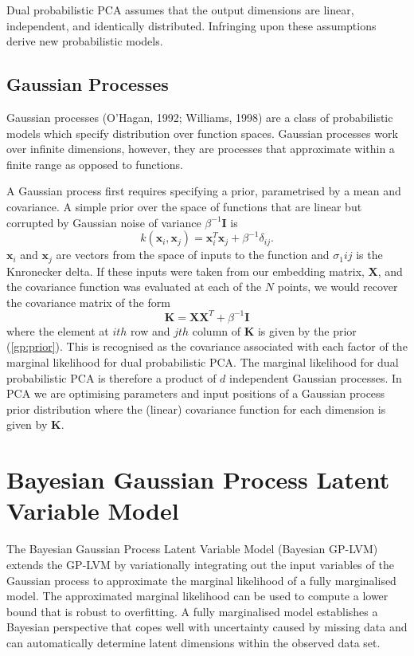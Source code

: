 \documentclass[ %
                    author={Dillon Keith Diep [INCOMPLETE DRAFT, NOT FOR SUBMISSION]},
                supervisor={Dr. Carl Henrik Ek},
                    degree={MEng},
                     title={ART-CG:},
                  subtitle={Assisted Real-Time Content Generation of 3D Hair Geometry},
                      type={Research},
                      year={2014} ]{dissertation}
\begin{document}
Dual probabilistic PCA assumes that the output dimensions are linear, independent, and identically distributed. Infringing upon these assumptions derive new probabilistic models.

\subsection{Gaussian Processes}
Gaussian processes (O'Hagan, 1992; Williams, 1998) are a class of probabilistic models which specify distribution over function spaces.
Gaussian processes work over infinite dimensions, however, they are processes that approximate within a finite range as opposed to functions.

A Gaussian process first requires specifying a prior, parametrised by a mean and covariance.
A simple prior over the space of functions that are linear but corrupted by Gaussian noise of variance $\beta^{-1}\mathbf{I}$ is
\begin{equation} \label{gp:prior}
	k(\mathbf{x}_i,\mathbf{x}_j)=\mathbf{x}^T_i\mathbf{x}_j+\beta^{-1}\delta_{ij}.
\end{equation}
$\mathbf{x}_i$ and $\mathbf{x}_j$ are vectors from the space of inputs to the function and $\sigma_1{ij}$ is the Knronecker delta. If these inputs were taken from our embedding matrix, $\mathbf{X}$, and the covariance function was evaluated at each of the $N$ points, we would recover the covariance matrix of the form
$$\mathbf{K=XX}^T+\beta^{-1}\mathbf{I}$$
where the element at $ith$ row and $jth$ column of $\mathbf{K}$ is given by the prior (\ref{gp:prior}). This is recognised as the covariance associated with each factor of the marginal likelihood for dual probabilistic PCA. The marginal likelihood for dual probabilistic PCA is therefore a product of $d$ independent Gaussian processes. In PCA we are optimising parameters and input positions of a Gaussian process prior distribution where the (linear) covariance function for each dimension is given by $\mathbf{K}$.

\section{Bayesian Gaussian Process Latent Variable Model}
The Bayesian Gaussian Process Latent Variable Model (Bayesian GP-LVM) \cite{bgplvm} extends the GP-LVM by variationally integrating out the input variables of the Gaussian process to approximate the marginal likelihood of a fully marginalised model. The approximated marginal likelihood can be used to compute a lower bound that is robust to overfitting. A fully marginalised model establishes a Bayesian perspective that copes well with uncertainty caused by missing data and can automatically determine latent dimensions within the observed data set.
\end{document}
